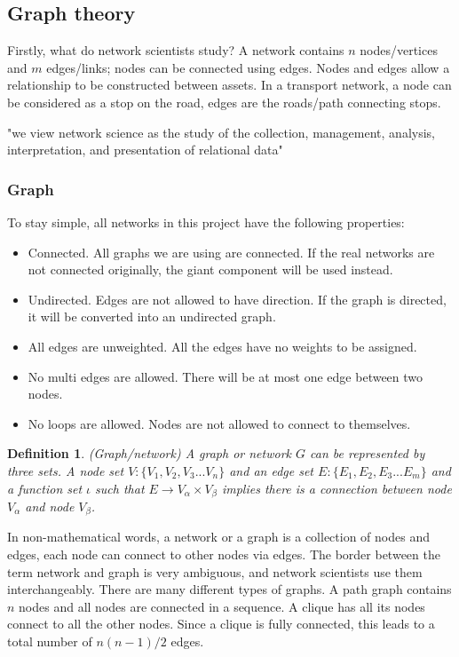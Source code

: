 \documentclass[12pt]{article}
\newtheorem{definition}{Definition}[section]
\begin{document}
\subsection{Graph theory}
Firstly, what do network scientists study? A network contains $n$ nodes/vertices and $m$ edges/links; nodes can be connected using edges. Nodes and edges allow a relationship to be constructed between assets. In a transport network, a node can be considered as a stop on the road, edges are the roads/path connecting stops.
\begin{center}
    "we view network science as the study of the collection,
    management, analysis, interpretation, and presentation of relational data" \cite{brandes_robins_mccranie_wasserman_2013}
\end{center}

\subsubsection{Graph}
\label{graph}
To stay simple, all networks in this project have the following properties:
\begin{itemize}
    \item Connected. All graphs we are using are connected. If the real networks are not connected originally, the giant component will be used instead.
    \item Undirected. Edges are not allowed to have direction. If the graph is directed, it will be converted into an undirected graph.
    \item All edges are unweighted. All the edges have no weights to be assigned.
    \item No multi edges are allowed. There will be at most one edge between two nodes.
    \item No loops are allowed. Nodes are not allowed to connect to themselves. 
\end{itemize}
\begin{definition}{(Graph/network)}
    A graph or network $G$ can be represented by three sets. A node set $V:\{V_1,V_2,V_3...V_n\}$ and an edge set $E:\{E_1,E_2,E_3...E_m\}$ and a function set $\iota$ such that $E\rightarrow V_\alpha\times V_\beta$ implies there is a connection between node $V_\alpha$ and node $V_\beta$.
\end{definition}
\par
In non-mathematical words, a network or a graph is a collection of nodes and edges, each node can connect to other nodes via edges. The border between the term network and graph is very ambiguous, and network scientists use them interchangeably. There are many different types of graphs. A path graph contains $n$ nodes and all nodes are connected in a sequence. A clique has all its nodes connect to all the other nodes. Since a clique is fully connected, this leads to a total number of $n(n-1)/2$ edges.
\end{document}
